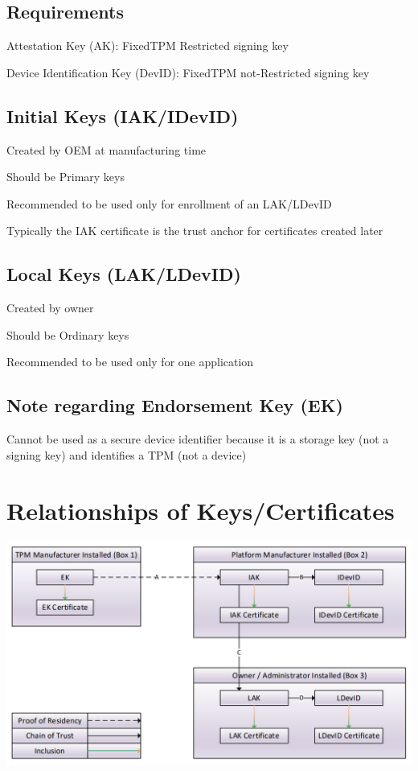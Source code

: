 \documentclass{article}
\begin{document}
\subsection*{Requirements}
Attestation Key (AK): FixedTPM Restricted signing key

Device Identification Key (DevID): FixedTPM not-Restricted signing key

\subsection*{Initial Keys (IAK/IDevID)}
Created by OEM at manufacturing time

Should be Primary keys

Recommended to be used only for enrollment of an LAK/LDevID

Typically the IAK certificate is the trust anchor for certificates created later

\subsection*{Local Keys (LAK/LDevID)}
Created by owner

Should be Ordinary keys

Recommended to be used only for one application

\subsection*{Note regarding Endorsement Key (EK)}
Cannot be used as a secure device identifier because it is a storage key (not a signing key) and identifies a TPM (not a device)

\section*{Relationships of Keys/Certificates}
\includegraphics[scale=0.6]{certificateRelationships.jpg}
\end{document}
